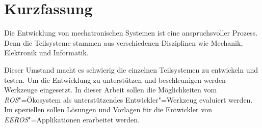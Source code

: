 \chapter*{Kurzfassung}



Die Entwicklung von mechatronischen Systemen ist eine anspruchsvoller Prozess.
Denn die Teilsysteme stammen aus verschiedenen Disziplinen wie Mechanik, Elektronik und Informatik.




Dieser Umstand macht es schwierig die einzelnen Teilsystemen zu entwickeln und testen.
Um die Entwicklung zu unterstützen und beschleunigen werden Werkzeuge eingesetzt.
In dieser Arbeit sollen die Möglichkeiten vom \textit{ROS}"=Ökosystem als unterstützendes Entwickler"=Werkzeug evaluiert werden.
Im speziellen sollen Lösungen und Vorlagen für die Entwickler von \textit{EEROS}"=Applikationen erarbeitet werden.


